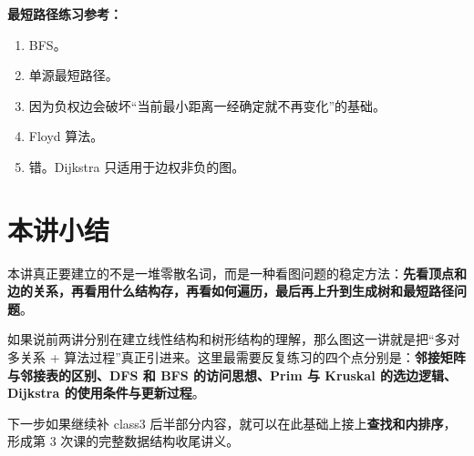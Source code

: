 \documentclass{../../note}
\begin{document}
\textbf{最短路径练习参考：}

\begin{enumerate}
  \item BFS。
  \item 单源最短路径。
  \item 因为负权边会破坏“当前最小距离一经确定就不再变化”的基础。
  \item Floyd 算法。
  \item 错。Dijkstra 只适用于边权非负的图。
\end{enumerate}

\section{本讲小结}

本讲真正要建立的不是一堆零散名词，而是一种看图问题的稳定方法：\textbf{先看顶点和边的关系，再看用什么结构存，再看如何遍历，最后再上升到生成树和最短路径问题}。

如果说前两讲分别在建立线性结构和树形结构的理解，那么图这一讲就是把“多对多关系 + 算法过程”真正引进来。这里最需要反复练习的四个点分别是：\textbf{邻接矩阵与邻接表的区别、DFS 和 BFS 的访问思想、Prim 与 Kruskal 的选边逻辑、Dijkstra 的使用条件与更新过程}。

下一步如果继续补 class3 后半部分内容，就可以在此基础上接上\textbf{查找和内排序}，形成第 3 次课的完整数据结构收尾讲义。
\end{document}
